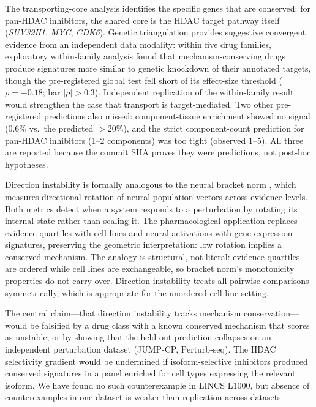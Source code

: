 \documentclass{article}
\begin{document}
The transporting-core analysis identifies the specific genes that are
conserved: for pan-HDAC inhibitors, the shared core is the HDAC target
pathway itself (\emph{SUV39H1}, \emph{MYC}, \emph{CDK6}). Genetic
triangulation provides suggestive convergent evidence from an
independent data modality: within five drug families, exploratory
within-family analysis found that mechanism-conserving drugs produce
signatures more similar to genetic knockdown of their annotated
targets, though the pre-registered global test fell short of its
effect-size threshold ($\rho = -0.18$; bar $|\rho| > 0.3$).
Independent replication of the within-family result would strengthen
the case that transport is target-mediated. Two other pre-registered
predictions also missed: component-tissue enrichment showed no signal
(0.6\% vs.\ the predicted $>$20\%), and the strict component-count
prediction for pan-HDAC inhibitors (1--2 components) was too tight
(observed 1--5). All three are reported because the commit SHA proves
they were predictions, not post-hoc hypotheses.

Direction instability is formally analogous to the neural bracket norm
\citep{tower2026bracket}, which measures directional rotation of
neural population vectors across evidence levels. Both metrics detect
when a system responds to a perturbation by rotating its internal
state rather than scaling it. The pharmacological application replaces
evidence quartiles with cell lines and neural activations with gene
expression signatures, preserving the geometric interpretation: low
rotation implies a conserved mechanism. The analogy is structural, not
literal: evidence quartiles are ordered while cell lines are
exchangeable, so bracket norm's monotonicity properties do not carry
over. Direction instability treats all pairwise comparisons
symmetrically, which is appropriate for the unordered cell-line
setting.

The central claim---that direction instability tracks mechanism
conservation---would be falsified by a drug class with a known
conserved mechanism that scores as unstable, or by showing that the
held-out prediction collapses on an independent perturbation dataset
(JUMP-CP, Perturb-seq). The HDAC selectivity gradient would be
undermined if isoform-selective inhibitors produced conserved
signatures in a panel enriched for cell types expressing the relevant
isoform. We have found no such counterexample in LINCS L1000, but
absence of counterexamples in one dataset is weaker than replication
across datasets.
\end{document}
